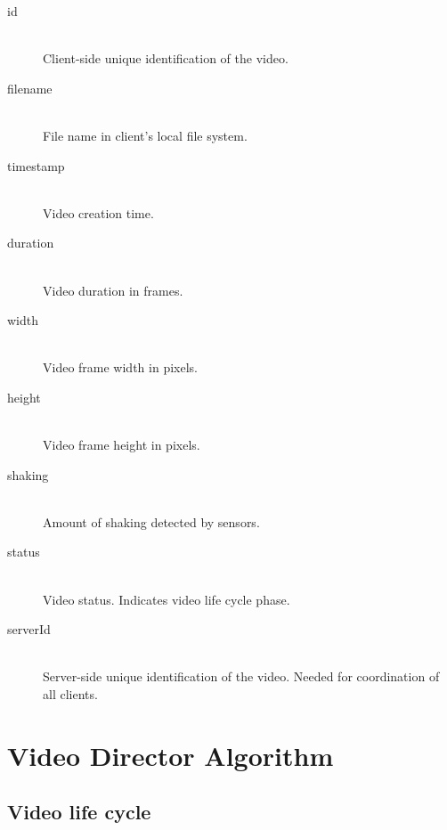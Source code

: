 \documentclass[conference]{IEEEtran}
\begin{document}
\begin{description}
	\item[id]\hfill\\
		Client-side unique identification of the video.
		
	\item[filename]\hfill\\
		File name in client's local file system.
		
	\item[timestamp]\hfill\\
		Video creation time.
		
	\item[duration]\hfill\\
		Video duration in frames.
		
	\item[width]\hfill\\
		Video frame width in pixels.

	\item[height]\hfill\\
		Video frame height in pixels.		
	
	\item[shaking]\hfill\\
		Amount of shaking detected by sensors.
	
	\item[status]\hfill\\
		Video status. Indicates video life cycle phase.
	
	\item[serverId]\hfill\\
		Server-side unique identification of the video. Needed for coordination of all clients.
		
\end{description}

\section{Video Director Algorithm}

\subsection{Video life cycle}
\end{document}
